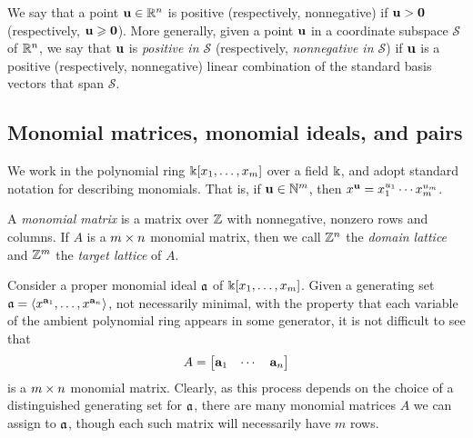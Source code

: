 \documentclass[11pt]{amsart}
\begin{document}
We say that a point $\mathbf{u}\in \mathbb{R}^n$ is positive (respectively, nonnegative) if $\mathbf{u} > \mathbf{0}$ (respectively, $\mathbf{u}\geqslant \mathbf{0}$).
More generally, given a point $\mathbf{u}$ in a coordinate subspace $\mathcal{S}$ of $\mathbb{R}^n$, we say that $\mathbf{u}$ is \emph{positive in $\mathcal{S}$} (respectively, \emph{nonnegative in $\mathcal{S}$}) if $\mathbf{u}$ is a positive (respectively, nonnegative) linear combination of the standard basis vectors that span $\mathcal{S}$.

\subsection{Monomial matrices, monomial ideals, and pairs}
\label{monomial newton preliminaries: ss}
We work in the polynomial ring $\Bbbk[x_1, \ldots, x_m]$ over a field $\Bbbk$, and adopt standard notation for describing monomials.  That is, if $\mathbf{u} \in \mathbb{N}^m$, then $x^{\mathbf{u}} = x_1^{u_1} \cdots x_m^{u_m}$.

\begin{definition}
\label{monomial matrix: D}
A \emph{monomial matrix} is a matrix over $\mathbb{Z}$ with nonnegative, nonzero rows and columns.
If $A$ is a $m \times n$ monomial matrix, then we call $\mathbb{Z}^n$ the \emph{domain lattice} and $\mathbb{Z}^m$ the \emph{target lattice} of $A$. 
\end{definition}

\begin{remark}
\label{monomial matrix ideal: R}  Consider a proper monomial ideal $\mathfrak{a}$ of $\Bbbk[x_1, \ldots, x_{m}]$.  Given a generating set $\mathfrak{a} = \langle x^{\mathbf{a}_1}, \ldots, x^{\mathbf{a}_n} \rangle$, not necessarily minimal, with the property that each variable of the ambient polynomial ring appears in some generator, it is not difficult to see that \[A= \begin{bmatrix} \mathbf{a}_1 & \cdots & \mathbf{a}_n \end{bmatrix}\] is a  $m \times n$ monomial matrix.  Clearly, as this process depends on the choice of a distinguished generating set for $\mathfrak{a}$, there are many monomial matrices $A$ we can assign to $\mathfrak{a}$, though each such matrix will necessarily have $m$ rows.
\end{remark}
\end{document}
